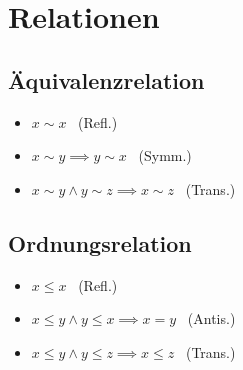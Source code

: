 \section*{Relationen}
\subsection*{Äquivalenzrelation}
\begin{itemize}
	\item $x \sim x$ ~(Refl.)
	\item $x \sim y \implies y \sim x$ ~(Symm.)
	\item $x \sim y \land y \sim z \implies x \sim z$ ~(Trans.)
\end{itemize}

\subsection*{Ordnungsrelation}
\begin{itemize}
	\item $x \le x$ ~(Refl.)
	\item $x \le y \land y \le x \implies x = y$ ~(Antis.)
	\item $x \le y \land y \le z \implies x \le z$ ~(Trans.)
\end{itemize}
